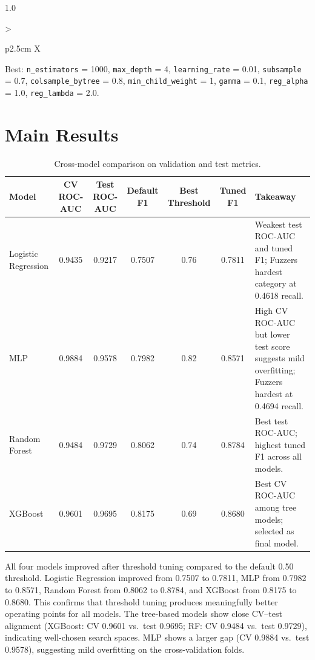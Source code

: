 \begin{spacing}{1.0}
\begin{table}[htbp]
\begin{tabularx}{\linewidth}{>{\raggedright\arraybackslash}p{2.5cm} X}
        Best: \texttt{n\_estimators} = 1000, \texttt{max\_depth} = 4, \texttt{learning\_rate} = 0.01, \texttt{subsample} = 0.7, \texttt{colsample\_bytree} = 0.8, \texttt{min\_child\_weight} = 1, \texttt{gamma} = 0.1, \texttt{reg\_alpha} = 1.0, \texttt{reg\_lambda} = 2.0. \\
        \bottomrule
    \end{tabularx}
\end{table}

\section{Main Results}
\begin{table}[htbp]
    \centering
    \footnotesize
    \setlength{\tabcolsep}{3pt}
    \caption{Cross-model comparison on validation and test metrics.}
    \label{tab:model-comparison-good}
    \begin{tabularx}{\linewidth}{>{\raggedright\arraybackslash}p{2.2cm} c c c c c X}
        \toprule
        Model & CV ROC-AUC & Test ROC-AUC & Default F1 & Best Threshold & Tuned F1 & Takeaway \\
        \midrule
        Logistic Regression & 0.9435 & 0.9217 & 0.7507 & 0.76 & 0.7811 & Weakest test ROC-AUC and tuned F1; Fuzzers hardest category at 0.4618 recall. \\
        MLP                 & 0.9884 & 0.9578 & 0.7982 & 0.82 & 0.8571 & High CV ROC-AUC but lower test score suggests mild overfitting; Fuzzers hardest at 0.4694 recall. \\
        Random Forest       & 0.9484 & 0.9729 & 0.8062 & 0.74 & 0.8784 & Best test ROC-AUC; highest tuned F1 across all models. \\
        XGBoost             & 0.9601 & 0.9695 & 0.8175 & 0.69 & 0.8680 & Best CV ROC-AUC among tree models; selected as final model. \\
        \bottomrule
    \end{tabularx}
\end{table}

All four models improved after threshold tuning compared to the default 0.50
threshold. Logistic Regression improved from 0.7507 to 0.7811, MLP from 0.7982
to 0.8571, Random Forest from 0.8062 to 0.8784, and XGBoost from 0.8175 to
0.8680. This confirms that threshold tuning produces meaningfully better
operating points for all models. The tree-based models show close CV--test
alignment (XGBoost: CV 0.9601 vs.\ test 0.9695; RF: CV 0.9484 vs.\ test
0.9729), indicating well-chosen search spaces. MLP shows a larger gap (CV
0.9884 vs.\ test 0.9578), suggesting mild overfitting on the cross-validation
folds.


\end{spacing}
